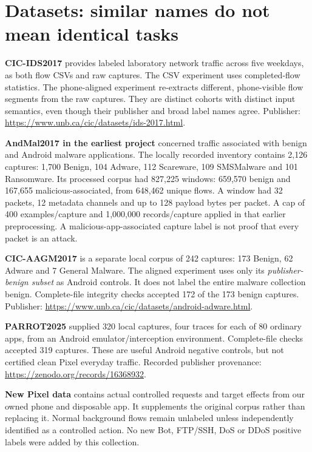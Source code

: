 \documentclass[11pt,a4paper,oneside]{report}
\begin{document}
\section{Datasets: similar names do not mean identical tasks}
\textbf{CIC-IDS2017} provides labeled laboratory network traffic across five weekdays, as both flow CSVs and raw captures. The CSV experiment uses completed-flow statistics. The phone-aligned experiment re-extracts different, phone-visible flow segments from the raw captures. They are distinct cohorts with distinct input semantics, even though their publisher and broad label names agree. Publisher: \url{https://www.unb.ca/cic/datasets/ids-2017.html}.

\textbf{AndMal2017 in the earliest project} concerned traffic associated with benign and Android malware applications. The locally recorded inventory contains 2,126 captures: 1,700 Benign, 104 Adware, 112 Scareware, 109 SMSMalware and 101 Ransomware. Its processed corpus had 827,225 windows: 659,570 benign and 167,655 malicious-associated, from 648,462 unique flows. A window had 32 packets, 12 metadata channels and up to 128 payload bytes per packet. A cap of 400 examples/capture and 1,000,000 records/capture applied in that earlier preprocessing. A malicious-app-associated capture label is not proof that every packet is an attack.

\textbf{CIC-AAGM2017} is a separate local corpus of 242 captures: 173 Benign, 62 Adware and 7 General Malware. The aligned experiment uses only its \emph{publisher-benign subset} as Android controls. It does not label the entire malware collection benign. Complete-file integrity checks accepted 172 of the 173 benign captures. Publisher: \url{https://www.unb.ca/cic/datasets/android-adware.html}.

\textbf{PARROT2025} supplied 320 local captures, four traces for each of 80 ordinary apps, from an Android emulator/interception environment. Complete-file checks accepted 319 captures. These are useful Android negative controls, but not certified clean Pixel everyday traffic. Recorded publisher provenance: \url{https://zenodo.org/records/16368932}.

\textbf{New Pixel data} contains actual controlled requests and target effects from our owned phone and disposable app. It supplements the original corpus rather than replacing it. Normal background flows remain unlabeled unless independently identified as a controlled action. No new Bot, FTP/SSH, DoS or DDoS positive labels were added by this collection.
\end{document}
